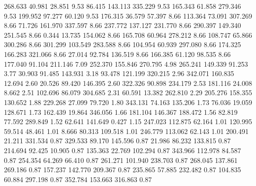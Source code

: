  268.633   40.981   28.851         9.53
  86.415  143.113  335.229         9.53
 165.343   61.858  279.346         9.53
 199.952   97.277   60.120         9.53
 176.315   36.579   57.397         8.66
 113.364   73.091  307.269         8.66
  71.726  161.970  337.597         8.66
 237.772  137.127  231.770         8.66
 290.397  149.340  251.545         8.66
   0.344   13.735  154.062         8.66
 165.708   60.964  278.212         8.66
 108.747   65.866  300.286         8.66
 301.299  103.549  283.588         8.66
 104.954   60.939  297.080         8.66
 174.325  166.283  321.066         8.66
  27.014   92.784  136.519         8.66
 166.385   61.120   98.535         8.66
 177.040   91.104  211.146         7.09
 252.370  155.846  270.795         4.98
 265.241  149.339   91.253         3.77
  30.903   91.485  143.931         3.18
  93.478  121.199  320.215         2.96
 342.071  160.835   12.694         2.60
  20.526   89.420  146.395         2.60
 322.326   90.898  234.179         2.53
 181.116   24.008    8.662         2.51
 102.696   86.079  304.685         2.31
  60.591   13.382  262.810         2.29
 205.276  158.355  130.652         1.88
 229.268   27.099   79.720         1.80
 343.131   74.163  135.206         1.73
  76.036   19.059  128.671         1.73
 162.439   19.864  346.056         1.66
 181.104  146.367  188.472         1.56
  82.819   77.592  289.849         1.52
  62.641  141.649    0.427         1.15
 247.023  112.875   62.164         1.01
 120.995   59.514   48.461         1.01
   8.666   80.313  109.518         1.01
 246.779  113.062   62.143         1.01
 200.491   21.211  331.534         0.87
 329.533   89.170  145.596         0.87
  21.986   86.232  133.815         0.87
 214.694   92.425   10.905         0.87
 135.363   22.769  102.294         0.87
 343.966  112.978   84.587         0.87
 254.354   64.269   66.410         0.87
 261.271  101.940  238.703         0.87
 268.045  137.861  269.186         0.87
 157.237  142.770  209.367         0.87
 235.865   57.885  232.482         0.87
 104.835   60.884  297.198         0.87
 352.784  153.663  316.863         0.87
